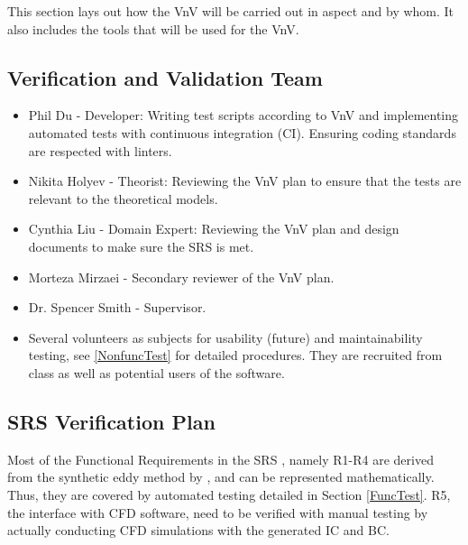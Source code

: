 \documentclass[12pt, titlepage]{article}
\begin{document}
This section lays out how the VnV will be carried out in aspect and by whom. It also includes the tools that will be used for the VnV.


\subsection{Verification and Validation Team}

\begin{itemize}
  \item Phil Du - Developer: Writing test scripts according to VnV and implementing automated tests with continuous integration (CI). Ensuring coding standards are respected with linters.
  \item Nikita Holyev - Theorist: Reviewing the VnV plan to ensure that the tests are relevant to the theoretical models.
  \item Cynthia Liu - Domain Expert: Reviewing the VnV plan and design documents to make sure the SRS is met.
  \item Morteza Mirzaei - Secondary reviewer of the VnV plan.
  \item Dr. Spencer Smith - Supervisor.
  \item Several volunteers as subjects for usability (future) and maintainability testing, see \ref{NonfuncTest} for detailed procedures. They are recruited from class as well as potential users of the software.
\end{itemize}


\subsection{SRS Verification Plan}

Most of the Functional Requirements in the SRS \citet{SRS}, namely R1-R4 are derived from the synthetic eddy method by \citet{PolettoEtAl2013}, and can be represented mathematically. Thus, they are covered by automated testing detailed in Section \ref{FuncTest}. R5, the interface with CFD software, need to be verified with manual testing by actually conducting CFD simulations with the generated IC and BC.
\end{document}
